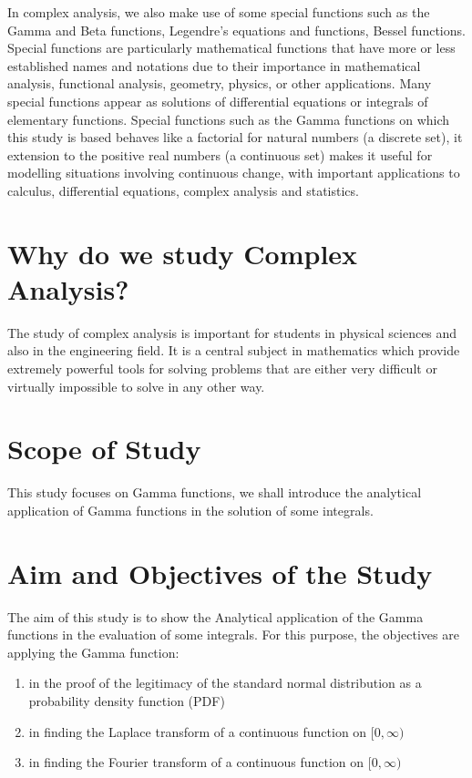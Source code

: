 \documentclass[11pt]{report}
\renewcommand{\labelenumi}{\roman{enumi}.}
\begin{document}
	In complex analysis, we also make use of some special functions such as the Gamma and Beta functions, Legendre's equations and functions, Bessel functions. Special functions are particularly mathematical functions that have more or less established names and notations due to their importance in mathematical analysis, functional analysis, geometry, physics, or other applications. Many special functions appear as solutions of differential equations or integrals of elementary functions. Special functions such as the Gamma functions on which this study is based behaves like a factorial for natural numbers (a discrete set), it extension to the positive real numbers (a continuous set) makes it useful for modelling situations involving continuous change, with important applications to calculus, differential equations, complex analysis and statistics.
	
	\section{Why do we study Complex Analysis?}
	The study of complex analysis is important for students in physical sciences and also in the engineering field. It is a central subject in mathematics which provide extremely powerful tools for solving problems that are either very difficult or virtually impossible to solve in any other way.
	
	\section{Scope of Study}
	This study focuses on Gamma functions, we shall introduce the analytical application of Gamma functions in the solution of some integrals. 
	
	
	\section{Aim and Objectives of the Study}
	The aim of this study is to show the Analytical application of the Gamma functions in the evaluation of some integrals. For this purpose, the objectives are applying the Gamma function:
	\begin{enumerate}
		\renewcommand{\labelenumi}{\roman{enumi})}
		\item in the proof of the legitimacy of the standard normal distribution as a probability density function (PDF)
		
		\item in finding the Laplace transform of a continuous function on $[0,\infty)$
		
		\item in finding the Fourier transform of a continuous function on $[0,\infty)$
	\end{enumerate}
	
\end{document}
